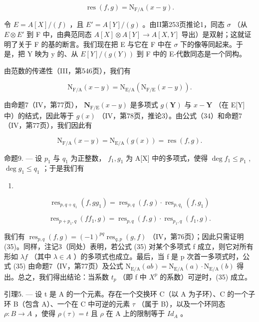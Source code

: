 \[
\operatorname{res} (f, g) = \mathrm{N} _ {\mathrm{F/A}} (x - y).\tag{33}
\]

令 \(E = A[X]/(f)\) ，且 \(E' = A[Y]/(g)\) 。由II第253页推论1，同态 \(\sigma\) （从 \(E \otimes E'\) 到 F 中，由典范同态 \(A[X] \otimes A[Y] \to A[X,Y]\) 导出）是双射；这就证明了关于 F 的基的断言。我们现在把 E 与它在 F 中在 \(\sigma\) 下的像等同起来。于是，把 Y 映为 y 的、从 \(E[Y]/(g(Y))\) 到 F 中的 E-代数同态是一个同构。

由范数的传递性（III，第546页），我们有

\[
\mathrm{N} _ {\mathrm{F/A}} (x - y) = \mathrm{N} _ {\mathrm{E/A}} (\mathrm{N} _ {\mathrm{F/E}} (x - y)).\tag{34}
\]

由命题7（IV，第77页）， \(\mathbf{N}_{\mathrm{F / E}}(x - y)\) 是多项式 \(g(\mathbf{Y})\) 与 \(x - \mathbf{Y}\) （在 E{[}Y{]} 中）的结式，因此等于 \(g(x)\) （IV，第78页，推论3）。由公式（34）和命题7（IV，第77页），我们因此有

\[
\mathrm{N} _ {\mathrm{F/A}} (x - y) = \mathrm{N} _ {\mathrm{E/A}} (g (x)) = \operatorname{res} (f, g).
\]

命题9. --- 设 \(p_1\) 与 \(q_1\) 为正整数， \(f_1, g_1\) 为 A{[}X{]} 中的多项式，使得 \(\deg f_1 \leqslant p_1\) , \(\deg g_1 \leqslant q_1\) ；于是我们有

\begin{enumerate}
\def\labelenumi{(\arabic{enumi})}
\setcounter{enumi}{34}
\tightlist
\item
\end{enumerate}

\[
\operatorname{res} _ {p, q + q _ {1}} (f, g g _ {1}) = \operatorname{res} _ {p, q} (f, g) \cdot \operatorname{res} _ {p, q _ {1}} (f, g _ {1})\tag{36}
\]

\[
\operatorname{res} _ {p + p _ {1}, q} (f f _ {1}, g) = \operatorname{res} _ {p, q} (f, g) \cdot \operatorname{res} _ {p _ {1}, q} (f _ {1}, g).
\]

我们有 \(\operatorname{res}_{p,q}(f,g)=(-1)^{pq}\operatorname{res}_{q,p}(g,f)\) （IV，第76页）；因此只需证明 (35)。同样，注记3（同处）表明，若公式 (35) 对某个多项式 f 成立，则它对所有形如 \(\lambda f\) （其中 \(\lambda\in A\) ）的多项式也成立。最后，当 f 是 p 次首一多项式时，公式 (35) 由命题7（IV，第77页）及公式 \(\mathrm{N}_{\mathrm{E}/\mathrm{A}}(ab)=\mathrm{N}_{\mathrm{E}/\mathrm{A}}(a)\cdot\mathrm{N}_{\mathrm{E}/\mathrm{A}}(b)\) 得出。总之，我们得出结论：当系数 \(t_{p}\) （即 f 中 \(X^{p}\) 的系数）可逆时，(35) 成立。

引理5. --- 设 t 是 A 的一个元素。存在一个交换环 C（以 A 为子环）、C 的一个子环 B（包含 A）、一个在 C 中可逆的元素 \(\tau\) （属于 B），以及一个环同态 \(\rho: B \to A\) ，使得 \(\rho(\tau) = t\) 且 \(\rho\) 在 A 上的限制等于 \(Id_{A}\) 。

